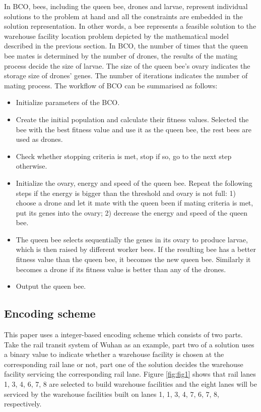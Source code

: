 In BCO, bees, including the queen bee, drones and larvae, represent individual solutions to the problem at hand and all the constraints are embedded in the solution representation.
In other words, a bee represents a feasible solution to the warehouse facility location problem depicted by the mathematical model described in the previous section.
In BCO, the number of times that the queen bee mates is determined by the number of drones, the results of the mating process decide the size of larvae.
The size of the queen bee's ovary indicates the storage size of drones' genes.
The number of iterations indicates the number of mating process.
The workflow of BCO can be summarised as follows:
\begin{itemize}
	\item Initialize parameters of the BCO.
	\item Create the initial population and calculate their fitness values. Selected the bee with the best fitness value and use it as the queen bee, the rest bees are used as drones.
	\item Check whether stopping criteria is met, stop if so, go to the next step otherwise.
	\item Initialize the ovary, energy and speed of the queen bee. 
	Repeat the following steps if the energy is bigger than the threshold and ovary is not full: 1) choose a drone and let it mate with the queen been if mating criteria is met, put its genes into the ovary; 2) decrease the energy and speed of the queen bee.
	\item The queen bee selects sequentially the genes in its ovary to produce larvae, which is then raised by different worker bees. If the resulting bee has a better fitness value than the queen bee, it becomes the new queen bee. Similarly it becomes a drone if its fitness value is better than any of the drones.
	\item Output the queen bee.
\end{itemize}



\subsection{Encoding scheme}
This paper uses a integer-based encoding scheme which consists of two parts.
Take the rail transit system of Wuhan as an example, part two of a solution uses a binary value to indicate whether a warehouse facility is chosen at the corresponding rail lane or not, part one of the solution decides the warehouse facility servicing the corresponding rail lane.
Figure \ref{fig:fig1} shows that rail lanes 1, 3, 4, 6, 7, 8 are selected to build warehouse facilities and the eight lanes will be serviced by the warehouse facilities built on lanes 1, 1, 3, 4, 7, 6, 7, 8, respectively.

